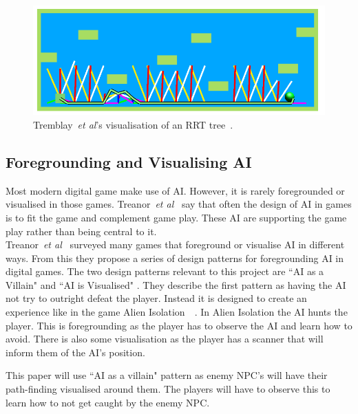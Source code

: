 \documentclass[journal]{IEEEtran}
\begin{document}
\begin{figure}[h]
	\includegraphics[width=1.0\linewidth]{Tremblay2014.png}
	\caption{ Tremblay~\textit{et al}'s visualisation of an RRT tree~\cite{Tremblay2014}.}
	\label{Tremblay2014}
\end{figure} 



\subsection{Foregrounding and Visualising AI}
Most modern digital game make use of AI.  However, it is rarely foregrounded or visualised in those games. Treanor~\textit{et al}~\cite{treanor2015} say that often the design of AI in games is to fit the game and complement game play. These AI are supporting the game play rather than being central to it.  \\

Treanor~\textit{et al}~\cite{treanor2015} surveyed many games that foreground or visualise AI in different ways.    From this they propose a series of design patterns for foregrounding AI in digital games. 
The two design patterns relevant to this project are ``AI as a Villain" and ``AI is Visualised" .  They describe the first pattern as having the AI not try to outright defeat the player. Instead it is designed to create an experience like in the game Alien Isolation~\cite{treanor2015}~\cite{game:AlienIsolation}.  In Alien Isolation the AI hunts the player. This is foregrounding as the player has to observe the AI and learn how to avoid.  There is also some visualisation as the player has a scanner that will inform them of the AI's position. 

This paper will use ``AI as a villain" pattern as enemy NPC's  will have their path-finding visualised around them. The players will have to observe this to learn how to not get caught by the enemy NPC.    
\end{document}
